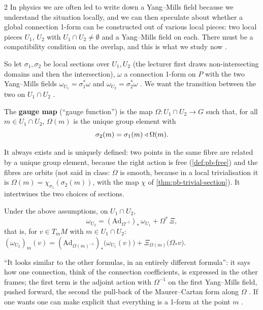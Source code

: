 \begin{paracol}{2}
In physics we are often led to write down a Yang--Mills field because we understand the situation locally, and we can then speculate about whether a global connection 1-form can be constructed out of various local pieces: two local pieces $U_1$, $U_2$ with $U_1\cap U_2\ne\emptyset$ and a Yang--Mills field on each. There must be a compatibility condition on the overlap, and this is what we study now     .

So let $\sigma_1,\sigma_2$ be local sections over $U_1,U_2$ (the lecturer first draws non-intersecting domains and then the intersection), $\omega$ a connection 1-form on $P$ with the two Yang--Mills fields $\omega_{U_1}=\sigma_1^*\omega$ and $\omega_{U_2}=\sigma_2^*\omega$   . We want the transition between the two on $U_1\cap U_2$ .
\begin{definition}\label{def:ym-gauge}
The \textbf{gauge map} (``gauge function'') is the map $\Omega\colon U_1\cap U_2\to G$ such that, for all $m\in U_1\cap U_2$, $\Omega(m)$ is the unique group element with
\[
  \sigma_2(m)=\sigma_1(m)\mathbin{\triangleleft}\Omega(m).
\]
    
\end{definition}
It always exists and is uniquely defined: two points in the same fibre are related by a unique group element, because the right action is free (\cref{def:pb-free}) and the fibres are orbits   (not said in class: $\Omega$ is smooth, because in a local trivialisation it is $\Omega(m)=\chi_{\sigma_1}(\sigma_2(m))$, with the map $\chi$ of \cref{thm:pb-trivial-section}). It intertwines the two choices of sections.
\begin{theorem}\label{thm:ym-gauge}
Under the above assumptions, on $U_1\cap U_2$,
\[
  \omega_{U_2}=(\mathrm{Ad}_{\Omega^{-1}})_*\,\omega_{U_1}+\Omega^*\,\Xi ,
\]
that is, for $v\in T_mM$ with $m\in U_1\cap U_2$: $(\omega_{U_2})_m(v)=(\mathrm{Ad}_{\Omega(m)^{-1}})_*\bigl(\omega_{U_1}(v)\bigr)+\Xi_{\Omega(m)}\bigl(\Omega_{*}v\bigr)$.     
\end{theorem}
``It looks similar to the other formulas, in an entirely different formula'': it says how one connection, think of the connection coefficients, is expressed in the other frames; the first term is the adjoint action with $\Omega^{-1}$ on the first Yang--Mills field, pushed forward, the second the pull-back of the Maurer--Cartan form along $\Omega$  . If one wants one can make explicit that everything is a 1-form at the point $m$ .

\end{paracol}
